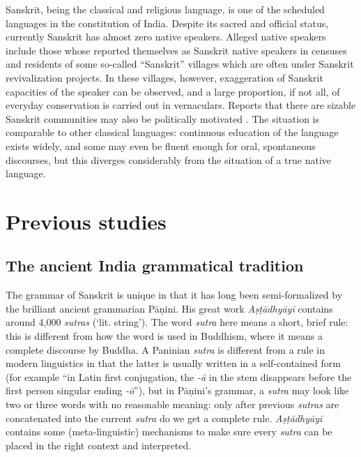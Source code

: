 \documentclass[a4paper, oneside, 12pt]{report}
\newcommand{\form}[1]{\emph{#1}}
\newcommand*{\source}[1]{\textit{#1}}
\newcommand{\translate}[1]{`#1'}
\begin{document}
Sanskrit, being the classical and religious language, 
is one of the scheduled languages in the constitution of India.
Despite its sacred and official status, currently Sanskrit has almost zero native speakers.
Alleged native speakers include those whose reported themselves as Sanskrit native speakers in censuses
and residents of some so-called ``Sanskrit'' villages which are often under Sanskrit revivalization projects.
In these villages, however, exaggeration of Sanskrit capacities of the speaker can be observed,
and a large proportion, if not all, of everyday conservation is carried out in vernaculars.
Reports that there are sizable Sanskrit communities may also be politically motivated
\citep{mccartney2017jhiri}.
The situation is comparable to other classical languages:
continuous education of the language exists widely,
and some may even be fluent enough for oral, spontaneous discourses,
but this diverges considerably from the situation of a true native language. 



\section{Previous studies}

\subsection{The ancient India grammatical tradition}\label{sec:intro.previous.panini}

The grammar of Sanskrit is unique in that it has long been semi-formalized 
by the brilliant ancient grammarian Pāṇini.
His great work \source{Aṣṭādhyāyī} contains around 4,000 \form{sutras} (\translate{lit. string}).
The word \form{sutra} here means a short, brief rule:
this is different from how the word is used in Buddhism,
where it means a complete discourse by Buddha.
A Paninian \form{sutra} is different from a rule in modern linguistics
in that the latter is usually written in a self-contained form
(for example ``in Latin first conjugation, the \form{-\={a}} in the stem disappears 
before the first person singular ending \form{-\={o}}''),
but in Pāṇini's grammar, a \form{sutra} may look like two or three words with no reasonable meaning:
only after previous \form{sutras} are concatenated into the current \form{sutra} do we get a complete rule.
\source{Aṣṭādhyāyī} contains some (meta-linguistic) mechanisms to make sure
every \form{sutra} can be placed in the right context and interpreted.
\end{document}
